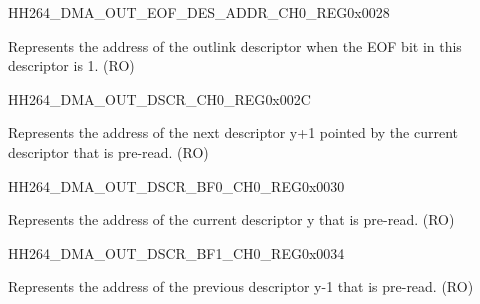 \begin{register}{H}{H264\_DMA\_OUT\_EOF\_DES\_ADDR\_CH0\_REG}{0x0028}\label{regdesc:H264DMAOUTEOFDESADDRCH0REG}
%
\regnewline%
\begin{regdesc}\begin{reglist}
\label{fielddesc:H264DMAOUTEOFDESADDRCH0}\item [H264\_DMA\_OUT\_EOF\_DES\_ADDR\_CH0] Represents the address of the outlink descriptor when the EOF bit in this descriptor is 1. (RO)
\end{reglist}\end{regdesc}
\end{register}


\begin{register}{H}{H264\_DMA\_OUT\_DSCR\_CH0\_REG}{0x002C}\label{regdesc:H264DMAOUTDSCRCH0REG}
%
\regnewline%
\begin{regdesc}\begin{reglist}
\label{fielddesc:H264DMAOUTLINKDSCRCH0}\item [H264\_DMA\_OUTLINK\_DSCR\_CH0] Represents the address of the next descriptor y+1 pointed by the current descriptor that is pre-read. (RO)
\end{reglist}\end{regdesc}
\end{register}


\begin{register}{H}{H264\_DMA\_OUT\_DSCR\_BF0\_CH0\_REG}{0x0030}\label{regdesc:H264DMAOUTDSCRBF0CH0REG}
%
\regnewline%
\begin{regdesc}\begin{reglist}
\label{fielddesc:H264DMAOUTLINKDSCRBF0CH0}\item [H264\_DMA\_OUTLINK\_DSCR\_BF0\_CH0] Represents the address of the current descriptor y that is pre-read. (RO)
\end{reglist}\end{regdesc}
\end{register}


\begin{register}{H}{H264\_DMA\_OUT\_DSCR\_BF1\_CH0\_REG}{0x0034}\label{regdesc:H264DMAOUTDSCRBF1CH0REG}
%
\regnewline%
\begin{regdesc}\begin{reglist}
\label{fielddesc:H264DMAOUTLINKDSCRBF1CH0}\item [H264\_DMA\_OUTLINK\_DSCR\_BF1\_CH0] Represents the address of the previous descriptor y-1 that is pre-read. (RO)
\end{reglist}\end{regdesc}
\end{register}


